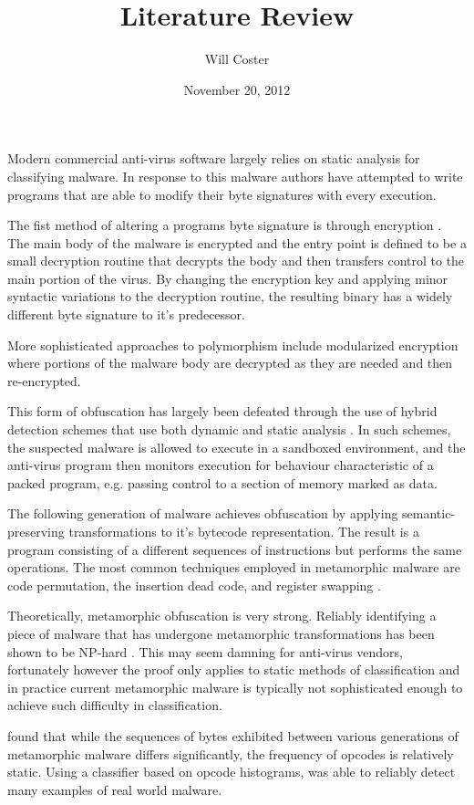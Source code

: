 \documentclass[finalcopy,short]{srpaper}
\title{Literature Review}
\author{Will Coster}
\date{November 20, 2012}
\begin{document}
  \frontmatter
  \nocite{*}

  Modern commercial anti-virus software largely relies on static analysis for
  classifying malware. In response to this malware authors have attempted to
  write programs that are able to modify their byte signatures with every
  execution.
  
  The fist method of altering a programs byte signature is through encryption
  \cite{simile}.  The main body of the malware is encrypted and the entry point
  is defined to be a small decryption routine that decrypts the body and then
  transfers control to the main portion of the virus. By changing the encryption
  key and applying minor syntactic variations to the decryption routine, the
  resulting binary has a widely different byte signature to it's predecessor.

  More sophisticated approaches to polymorphism include modularized encryption
  where portions of the malware body are decrypted as they are needed and then
  re-encrypted.

  This form of obfuscation has largely been defeated through the use of hybrid
  detection schemes that use both dynamic and static analysis \cite{polyunpack}.
  In such schemes, the suspected malware is allowed to execute in a sandboxed
  environment, and the anti-virus program then monitors execution for behaviour
  characteristic of a packed program, e.g. passing control to a section of
  memory marked as data.

  The following generation of malware achieves obfuscation by applying
  semantic-preserving transformations to it's bytecode representation. The
  result is a program consisting of a different sequences of instructions but
  performs the same operations. The most common techniques employed in
  metamorphic malware are code permutation, the insertion dead code, and
  register swapping \cite{simile}.

  Theoretically, metamorphic obfuscation is very strong. Reliably identifying a
  piece of malware that has undergone metamorphic transformations has been shown
  to be NP-hard \cite{npcomplete}. This may seem damning for anti-virus vendors,
  fortunately however the proof only applies to static methods of classification
  and in practice current metamorphic malware is typically not sophisticated
  enough to achieve such difficulty in classification.

  \cite{histogram} found that while the sequences of bytes exhibited between
  various generations of metamorphic malware differs significantly, the
  frequency of opcodes is relatively static. Using a classifier based on opcode
  histograms, \cite{histogram} was able to reliably detect many examples of
  real world malware.
\end{document}
